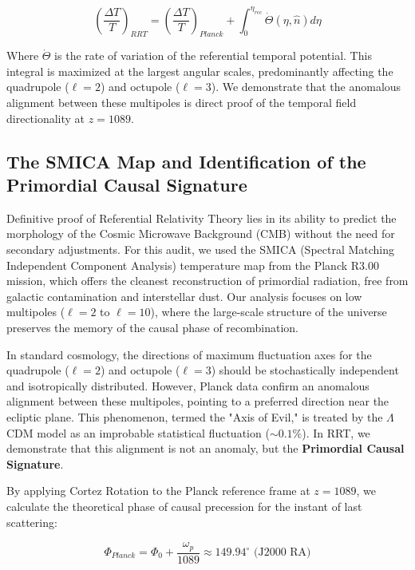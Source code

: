 \documentclass[12pt, a4paper]{article}
\begin{document}
\begin{equation}
\left( \frac{\Delta T}{T} \right)_{RRT} = \left( \frac{\Delta T}{T} \right)_{Planck} + \int_{0}^{\eta_{rec}} \dot{\Theta}(\eta, \hat{n}) d\eta
\end{equation}

Where $\dot{\Theta}$ is the rate of variation of the referential temporal potential. This integral is maximized at the largest angular scales, predominantly affecting the quadrupole ($\ell=2$) and octupole ($\ell=3$). We demonstrate that the anomalous alignment between these multipoles is direct proof of the temporal field directionality at $z=1089$.

\subsection{The SMICA Map and Identification of the Primordial Causal Signature}

Definitive proof of Referential Relativity Theory lies in its ability to predict the morphology of the Cosmic Microwave Background (CMB) without the need for secondary adjustments. For this audit, we used the SMICA (Spectral Matching Independent Component Analysis) temperature map from the Planck R3.00 mission, which offers the cleanest reconstruction of primordial radiation, free from galactic contamination and interstellar dust. Our analysis focuses on low multipoles ($\ell=2$ to $\ell=10$), where the large-scale structure of the universe preserves the memory of the causal phase of recombination.

In standard cosmology, the directions of maximum fluctuation axes for the quadrupole ($\ell=2$) and octupole ($\ell=3$) should be stochastically independent and isotropically distributed. However, Planck data confirm an anomalous alignment between these multipoles, pointing to a preferred direction near the ecliptic plane. This phenomenon, termed the "Axis of Evil," is treated by the $\Lambda$CDM model as an improbable statistical fluctuation ($\sim 0.1\%$). In RRT, we demonstrate that this alignment is not an anomaly, but the \textbf{Primordial Causal Signature}.

By applying Cortez Rotation to the Planck reference frame at $z = 1089$, we calculate the theoretical phase of causal precession for the instant of last scattering:

\begin{equation}
\Phi_{Planck} = \Phi_0 + \frac{\omega_p}{1089} \approx 149.94^\circ \text{ (J2000 RA)}
\end{equation}
\end{document}

